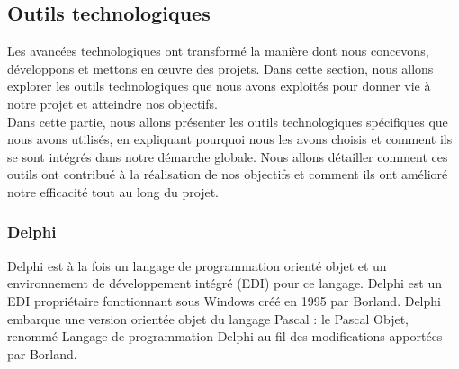 \documentclass[a4paper, 12pt, french]{article}
\begin{document}


			
			\subsection{Outils technologiques}				
				Les avancées technologiques ont transformé la manière dont nous concevons, développons et mettons en œuvre des projets. Dans cette section, nous allons explorer les outils technologiques que nous avons exploités pour donner vie à notre projet et atteindre nos objectifs.\\

				Dans cette partie, nous allons présenter les outils technologiques spécifiques que nous avons utilisés, en expliquant pourquoi nous les avons choisis et comment ils se sont intégrés dans notre démarche globale. Nous allons détailler comment ces outils ont contribué à la réalisation de nos objectifs et comment ils ont amélioré notre efficacité tout au long du projet.

				\subsubsection{Delphi}%
					Delphi est à la fois un langage de programmation orienté objet et un environnement de développement intégré (EDI) pour ce langage. Delphi est un EDI propriétaire fonctionnant sous Windows créé en 1995 par Borland. Delphi embarque une version orientée objet du langage Pascal : le Pascal Objet, renommé Langage de programmation Delphi au fil des modifications apportées par Borland.
\end{document}
